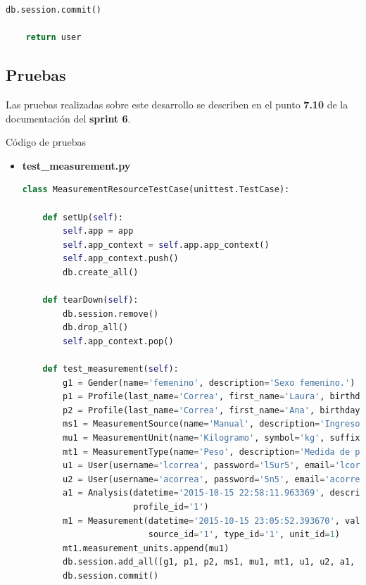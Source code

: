 \begin{enumerate}
\begin{lstlisting}[language=Python]
    db.session.commit()

    return user
\end{lstlisting}

\end{enumerate}

\subsection{Pruebas}

Las pruebas realizadas sobre este desarrollo se describen en el punto \textbf{7.10} de la documentación del \textbf{sprint 6}.

Código de pruebas

\begin{itemize}

\item \textbf{test\_measurement.py}

\begin{lstlisting}[language=Python]
class MeasurementResourceTestCase(unittest.TestCase):

    def setUp(self):
        self.app = app
        self.app_context = self.app.app_context()
        self.app_context.push()
        db.create_all()

    def tearDown(self):
        db.session.remove()
        db.drop_all()
        self.app_context.pop()

    def test_measurement(self):
        g1 = Gender(name='femenino', description='Sexo femenino.')
        p1 = Profile(last_name='Correa', first_name='Laura', birthday='1998-08-20', gender_id='1')
        p2 = Profile(last_name='Correa', first_name='Ana', birthday='1998-04-10', gender_id='1')
        ms1 = MeasurementSource(name='Manual', description='Ingreso manual de la medida.')
        mu1 = MeasurementUnit(name='Kilogramo', symbol='kg', suffix='True')
        mt1 = MeasurementType(name='Peso', description='Medida de peso de una persona')
        u1 = User(username='lcorrea', password='l5ur5', email='lcorrea@yesdoc.com', profile_id='1')
        u2 = User(username='acorrea', password='5n5', email='acorrea@yesdoc.com', profile_id='2')
        a1 = Analysis(datetime='2015-10-15 22:58:11.963369', description='Primer toma de medidas de peso',
                      profile_id='1')
        m1 = Measurement(datetime='2015-10-15 23:05:52.393670', value='74', analysis_id='1', profile_id='1',
                         source_id='1', type_id='1', unit_id=1)
        mt1.measurement_units.append(mu1)
        db.session.add_all([g1, p1, p2, ms1, mu1, mt1, u1, u2, a1, m1])
        db.session.commit()


\end{lstlisting}
\end{itemize}
